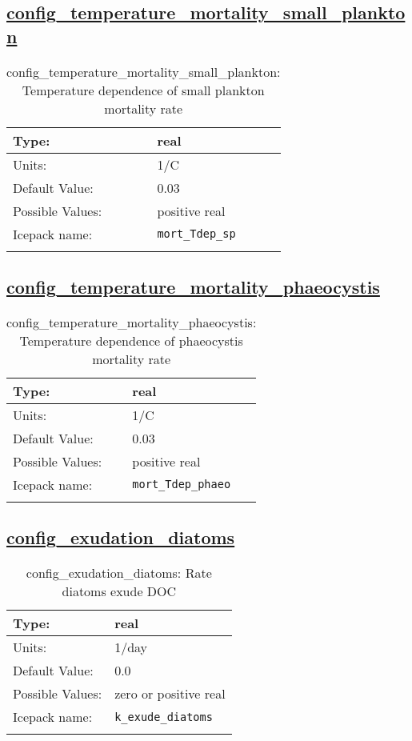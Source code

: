 \subsection[config\_temperature\_mortality\_small\_plankton]{\hyperref[sec:nm_tab_biogeochemistry]{config\_temperature\_mortality\_small\_plankton}}
\label{subsec:nm_sec_config_temperature_mortality_small_plankton}
\begin{center}
\begin{longtable}{| p{2.0in} || p{4.0in} |}
    \hline
    Type: & real \\
    \hline
    Units: & \si{1/C} \\
    \hline
    Default Value: & 0.03 \\
    \hline
    Possible Values: & positive real \\
    \hline
    Icepack name: & \verb+mort_Tdep_sp+ \\
    \hline
    \caption{config\_temperature\_mortality\_small\_plankton: Temperature dependence of small plankton mortality rate}
\end{longtable}
\end{center}
\subsection[config\_temperature\_mortality\_phaeocystis]{\hyperref[sec:nm_tab_biogeochemistry]{config\_temperature\_mortality\_phaeocystis}}
\label{subsec:nm_sec_config_temperature_mortality_phaeocystis}
\begin{center}
\begin{longtable}{| p{2.0in} || p{4.0in} |}
    \hline
    Type: & real \\
    \hline
    Units: & \si{1/C} \\
    \hline
    Default Value: & 0.03 \\
    \hline
    Possible Values: & positive real \\
    \hline
    Icepack name: & \verb+mort_Tdep_phaeo+ \\
    \hline
    \caption{config\_temperature\_mortality\_phaeocystis: Temperature dependence of phaeocystis mortality rate}
\end{longtable}
\end{center}
\subsection[config\_exudation\_diatoms]{\hyperref[sec:nm_tab_biogeochemistry]{config\_exudation\_diatoms}}
\label{subsec:nm_sec_config_exudation_diatoms}
\begin{center}
\begin{longtable}{| p{2.0in} || p{4.0in} |}
    \hline
    Type: & real \\
    \hline
    Units: & \si{1/day} \\
    \hline
    Default Value: & 0.0 \\
    \hline
    Possible Values: & zero or positive real \\
    \hline
    Icepack name: & \verb+k_exude_diatoms+ \\
    \hline
    \caption{config\_exudation\_diatoms: Rate diatoms exude DOC}
\end{longtable}
\end{center}
